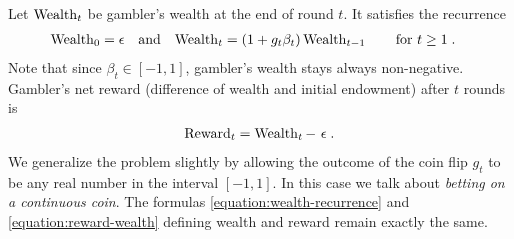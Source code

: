 Let $\operatorname{Wealth}_t$ be gambler's wealth at the end of round $t$. It satisfies the
recurrence
\begin{align}
\label{equation:wealth-recurrence}
\operatorname{Wealth}_0 & = \epsilon &
& \text{and} &
\operatorname{Wealth}_t & = (1 + g_t \beta_t) \operatorname{Wealth}_{t-1} \qquad \text{for $t \ge 1$} \; .
\end{align}
Note that since $\beta_t \in [-1,1]$, gambler's wealth stays always non-negative.
Gambler's net reward (difference of wealth and initial endowment) after $t$
rounds is
\begin{align}
\label{equation:reward-wealth}
\operatorname{Reward}_t = \operatorname{Wealth}_t - \ \epsilon \; .
\end{align}
We generalize the problem slightly by allowing the outcome of the coin flip
$g_t$ to be any real number in the interval $[-1,1]$. In this case we talk
about \emph{betting on a continuous coin}. The formulas
\eqref{equation:wealth-recurrence} and \eqref{equation:reward-wealth} defining
wealth and reward remain exactly the same.
